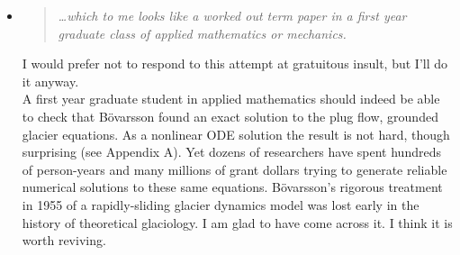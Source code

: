 \documentclass[11pt,reqno]{amsart}
\renewcommand{\dh}{\fontencoding{T1}\selectfont{\symbol{240}}}
\newcommand{\bod}{B\"o\dh varsson\xspace}
\newcommand{\reply}[2]{
\medskip\medskip
\item  \begin{quote}
\emph{#1}
\end{quote}

\medskip
\noindent #2}
\begin{document}
\begin{itemize}
\reply{\dots which to me looks like a worked out term paper in a first year graduate class of applied mathematics or mechanics.}
{I would prefer not to respond to this attempt at gratuitous insult, but I'll do it anyway. \medskip \\
A first year graduate student in applied mathematics should indeed be able to check that \bod found an exact solution to the plug flow, grounded glacier equations.  As a nonlinear ODE solution the result is not hard, though surprising (see Appendix A).  Yet dozens of researchers have spent hundreds of person-years and many millions of grant dollars trying to generate reliable numerical solutions to these same equations.  \bod's rigorous treatment in 1955 of a rapidly-sliding glacier dynamics model was lost early in the history of theoretical glaciology.  I am glad to have come across it.  I think it is worth reviving.}
\end{itemize}
\end{document}
